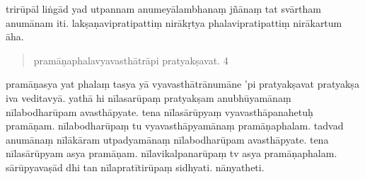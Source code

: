 \documentclass{article}
\begin{document}
\pend
\pstart
trirūpāl liṅgād yad utpannam anumeyālambhanaṃ jñānaṃ tat svārtham anumānam iti.
\pend
\pstart
 lakṣaṇavipratipattiṃ nirākṛtya phalavipratipattiṃ nirākartum āha. 
\pend
\pstart
\begin{quote}
pramāṇaphalavyavasthātrāpi pratyakṣavat. 4
\end{quote} 
\pend
\pstart
pramāṇasya yat phalaṃ tasya yā vyavasthātrānumāne 'pi pratyakṣavat pratyakṣa iva veditavyā. 
 \pend
 \pstart
{}yathā hi nīlasarūpaṃ pratyakṣam anubhūyamānaṃ nīlabodharūpam avasthāpyate. tena nīlasārūpyaṃ vyavasthāpanahetuḥ pramāṇam. nīlabodharūpaṃ tu vyavasthāpyamānaṃ pramāṇaphalam. tadvad anumānaṃ nīlākāram utpadyamānaṃ nīlabodharūpam avasthāpyate. tena nīlasārūpyam asya pramāṇam. nīlavikalpanarūpaṃ tv asya pramāṇaphalam. sārūpyavaṣād dhi tan nīlapratītirūpaṃ sidhyati. nānyatheti.
\pend
{}\baselineskip
\end{document}
